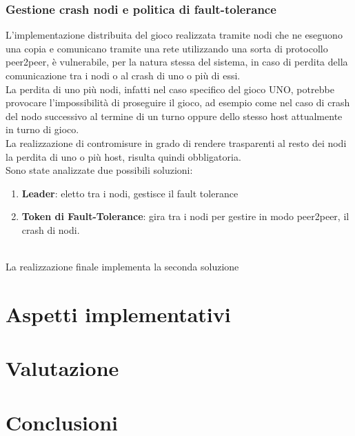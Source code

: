 \documentclass[10pt,a4paper]{article}
\begin{document}
\subsubsection{Gestione crash nodi e politica di fault-tolerance}
L'implementazione distribuita del gioco realizzata tramite nodi che ne eseguono una copia e comunicano tramite una rete utilizzando una sorta di protocollo peer2peer, è vulnerabile, per la natura stessa del sistema, in caso di perdita della comunicazione tra i nodi o al crash di uno o più di essi. \\La perdita di uno più nodi, infatti nel caso specifico del gioco UNO, potrebbe provocare l'impossibilità di proseguire il gioco, ad esempio come nel caso di crash del nodo successivo al termine di un turno oppure dello stesso host attualmente in turno di gioco.\\ La realizzazione di contromisure in grado di rendere trasparenti al resto dei nodi la perdita di uno o più host, risulta quindi obbligatoria. \\ Sono state analizzate due possibili soluzioni:\begin{enumerate}\item \textbf{Leader}: eletto tra i nodi, gestisce il fault tolerance\item \textbf{Token di Fault-Tolerance}: gira tra i nodi per gestire in modo peer2peer, il crash di nodi.\end{enumerate}\\ La realizzazione finale implementa la seconda soluzione 


\section{Aspetti implementativi}

\section{Valutazione}

\section{Conclusioni}
\end{document}
